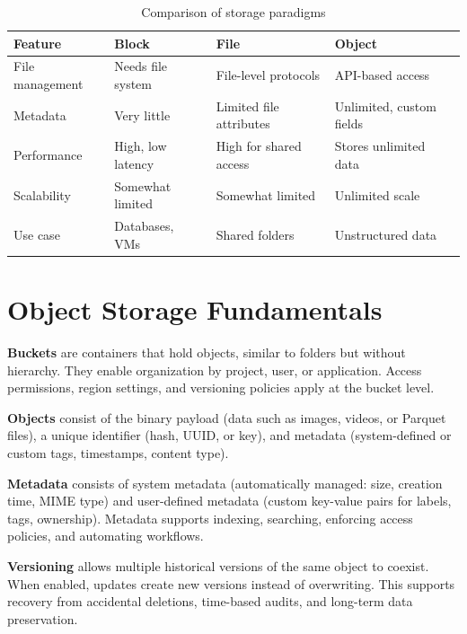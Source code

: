 \begin{table}[H]
\centering
\caption{Comparison of storage paradigms}
\label{tab:storage-comparison}
\begin{tabular}{p{3.5cm}p{3.5cm}p{3.5cm}p{3.5cm}}
\hline
\textbf{Feature}         & \textbf{Block}            & \textbf{File}             & \textbf{Object}           \\
\hline
File management          & Needs file system         & File-level protocols      & API-based access          \\
Metadata                 & Very little               & Limited file attributes   & Unlimited, custom fields  \\
Performance              & High, low latency         & High for shared access    & Stores unlimited data     \\
Scalability              & Somewhat limited          & Somewhat limited          & Unlimited scale           \\
Use case                 & Databases, VMs            & Shared folders            & Unstructured data         \\
\hline
\end{tabular}
\end{table}

\section{Object Storage Fundamentals}\label{sec:fundamentals}

\textbf{Buckets} are containers that hold objects, similar to folders but without hierarchy. They enable organization by project, user, or application. Access permissions, region settings, and versioning policies apply at the bucket level.

\textbf{Objects} consist of the binary payload (data such as images, videos, or Parquet files), a unique identifier (hash, UUID, or key), and metadata (system-defined or custom tags, timestamps, content type).

\textbf{Metadata} consists of system metadata (automatically managed: size, creation time, MIME type) and user-defined metadata (custom key-value pairs for labels, tags, ownership). Metadata supports indexing, searching, enforcing access policies, and automating workflows.

\textbf{Versioning} allows multiple historical versions of the same object to coexist. When enabled, updates create new versions instead of overwriting. This supports recovery from accidental deletions, time-based audits, and long-term data preservation. 

